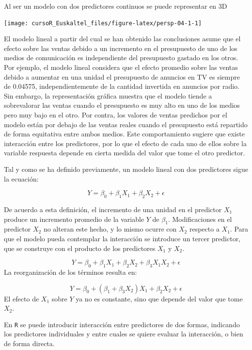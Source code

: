 \documentclass[]{book}
\begin{document}
Al ser un modelo con dos predictores continuos se puede representar en
3D

\begin{center}\texttt{[image: cursoR\_Euskaltel\_files/figure-latex/persp-04-1-1]} \end{center}

El modelo lineal a partir del cual se han obtenido las conclusiones
asume que el efecto sobre las ventas debido a un incremento en el
presupuesto de uno de los medios de comunicación es independiente del
presupuesto gastado en los otros. Por ejemplo, el modelo lineal
considera que el efecto promedio sobre las ventas debido a aumentar en
una unidad el presupuesto de anuncios en TV es siempre de 0.04575,
independientemente de la cantidad invertida en anuncios por radio. Sin
embargo, la representación gráfica muestra que el modelo tiende a
sobrevalorar las ventas cuando el presupuesto es muy alto en uno de los
medios pero muy bajo en el otro. Por contra, los valores de ventas
predichos por el modelo están por debajo de las ventas reales cuando el
presupuesto está repartido de forma equitativa entre ambos medios. Este
comportamiento sugiere que existe interacción entre los predictores, por
lo que el efecto de cada uno de ellos sobre la variable respuesta
depende en cierta medida del valor que tome el otro predictor.

Tal y como se ha definido previamente, un modelo lineal con dos
predictores sigue la ecuación:

\[
Y={\beta}_0+ \beta_1 X_1+ \beta_2 X_2+ \epsilon
\]

De acuerdo a esta definición, el incremento de una unidad en el
predictor \(X_1\) produce un incremento promedio de la variable \(Y\) de
\(\beta_1\). Modificaciones en el predictor \(X_2\) no alteran este
hecho, y lo mismo ocurre con \(X_2\) respecto a \(X_1\). Para que el
modelo pueda contemplar la interacción se introduce un tercer predictor,
que se construye con el producto de los predictores \(X_1\) y \(X_2\).

\[
Y=\beta_0+\beta_1 X_1+\beta_2 X_2+ \beta_3 X_1X_2+\epsilon
\] La reorganización de los términos resulta en:

\[
  Y=\beta_0+(\beta_1+\beta_3 X_2)X_1+\beta_2X_2+\epsilon
\] El efecto de \(X_1\) sobre \(Y\) ya no es constante, sino que depende
del valor que tome \(X_2\).

En \texttt{R} se puede introducir interacción entre predictores de dos
formas, indicando los predictores individuales y entre cuales se quiere
evaluar la interacción, o bien de forma directa.
\end{document}
